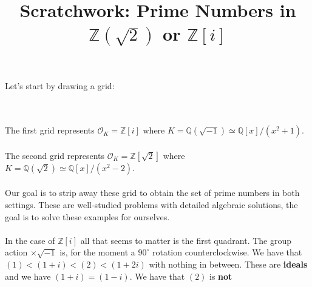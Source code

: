 \documentclass[12pt]{article}
\title{Scratchwork: Prime Numbers in $\mathbb{Z}(\sqrt{2})$ or $\mathbb{Z}[i]$}
\date{}
\begin{document}

\sffamily

\maketitle

\noindent Let's start by drawing a grid: \\ \\
 \\ 
The first grid represents $\mathcal{O}_K = \mathbb{Z}[i]$ where $K = \mathbb{Q}(\sqrt{-1}) \simeq \mathbb{Q}[x]/(x^2 + 1)$. \\ \\
The second grid represents $\mathcal{O}_K = \mathbb{Z}[\sqrt{2}]$ where $K = \mathbb{Q}(\sqrt{2}) \simeq \mathbb{Q}[x]/(x^2 - 2)$. \\ \\
Our goal is to strip away these grid to obtain the set of prime numbers in both settings.  These are well-studied problems with detailed algebraic solutions, the goal is to solve these examples for ourselves. \\ \\
In the case of $\mathbb{Z}[i]$ all that seems to matter is the first quadrant.  The group action $\times \sqrt{-1}$ is, for the moment a $90^\circ$ rotation counterclockwise.  We have that $(1) < (1+i) < (2) < (1+2i) $ with nothing in between.  These are \textbf{ideals} and we have $(1+i) = (1-i)$.  We have that $(2)$ is \textbf{not}
\end{document}
